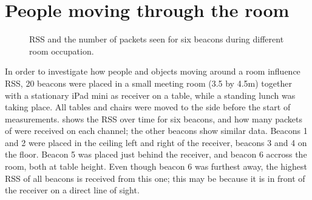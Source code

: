 \section{People moving through the room}
\label{sec:rss-busyroom}
\begin{figure}[p]
    \begin{subfigure}[b]{0.5\textwidth}
    \end{subfigure}
    \begin{subfigure}[b]{0.5\textwidth}
    \end{subfigure}
    \begin{subfigure}[b]{0.5\textwidth}
    \end{subfigure}
    \begin{subfigure}[b]{0.5\textwidth}
    \end{subfigure}
    \begin{subfigure}[b]{0.5\textwidth}
    \end{subfigure}
    \begin{subfigure}[b]{0.5\textwidth}
    \end{subfigure}
    \caption{RSS and the number of packets seen for six beacons during different room occupation.}
    \label{fig:rss-busyroom}
\end{figure}

In order to investigate how people and objects moving around a room influence RSS, 20 beacons were placed in a small meeting room (3.5 by 4.5m) together with a stationary iPad mini as receiver on a table, while a standing lunch was taking place.
All tables and chairs were moved to the side before the start of measurements.
 shows the RSS over time for six beacons, and how many packets of were received on each channel; the other beacons show similar data.
Beacons 1 and 2 were placed in the ceiling left and right of the receiver, beacons 3 and 4 on the floor.
Beacon 5 was placed just behind the receiver, and beacon 6 accross the room, both at table height.
Even though beacon 6 was furthest away, the highest RSS of all beacons is received from this one; this may be because it is in front of the receiver on a direct line of sight.

